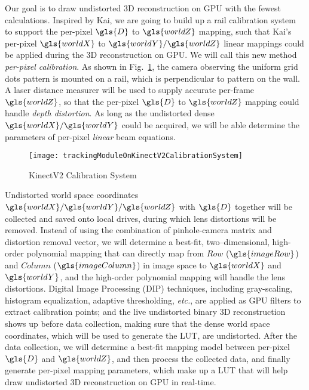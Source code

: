 Our goal is to draw undistorted \gls{3D} reconstruction on \gls{GPU} with the fewest calculations. Inspired by Kai, we are going to build up a rail calibration system to support the per-pixel \(\gls{D}\) to \(\gls{worldZ}\) mapping, such that Kai's per-pixel \(\gls{worldX}\) to \(\gls{worldY}/\gls{worldZ}\) linear mappings could be applied during the \gls{3D} reconstruction on \gls{GPU}. We will call this new method \textit{per-pixel calibration}. As shown in Fig.~\ref{trackingModuleOnKinectV2CalibrationSystem}, the camera observing the uniform grid dots pattern is mounted on a rail, which is perpendicular to pattern on the wall. A laser distance measurer will be used to supply accurate per-frame \(\gls{worldZ}\), so that the per-pixel \(\gls{D}\) to \(\gls{worldZ}\) mapping could handle \emph{depth distortion}. As long as the undistorted dense \(\gls{worldX}/\gls{worldY}\) could be acquired, we will be able determine the parameters of per-pixel \emph{linear} beam equations.
\\\indent
\begin{figure}[t]
\centering
\texttt{[image: trackingModuleOnKinectV2CalibrationSystem]}
\caption{\gls{KinectV2} Calibration System}
\label{trackingModuleOnKinectV2CalibrationSystem}
\end{figure}%
Undistorted world space coordinates \(\gls{worldX}/\gls{worldY}/\gls{worldZ}\) with \(\gls{D}\) together will be collected and saved onto local drives, during which lens distortions will be removed. Instead of using the combination of pinhole-camera matrix and distortion removal vector, we will determine a best-fit, two--dimensional, high-order polynomial mapping that can directly map from \(Row\) (\(\gls{imageRow}\)) and \(Column\) (\(\gls{imageColumn}\)) in image space to \(\gls{worldX}\) and \(\gls{worldY}\), and the high-order polynomial mapping will handle the lens distortions. Digital Image Processing (\gls{DIP}) techniques, including gray-scaling, histogram equalization, adaptive thresholding, \textit{etc.}, are applied as GPU filters to extract calibration points; and the live undistorted binary 3D reconstruction shows up before data collection, making sure that the dense world space coordinates, which will be used to generate the \gls{LUT}, are undistorted. After the data collection, we will determine a best-fit mapping model between per-pixel \(\gls{D}\) and \(\gls{worldZ}\), and then process the collected data, and finally generate per-pixel mapping parameters, which make up a \gls{LUT} that will help draw undistorted \gls{3D} reconstruction on \gls{GPU} in real-time.
